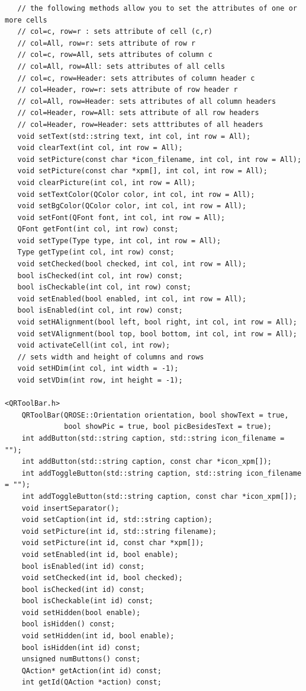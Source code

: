 \begin{enumerate}
\begin{lstlisting}
   // the following methods allow you to set the attributes of one or more cells
   // col=c, row=r : sets attribute of cell (c,r)
   // col=All, row=r: sets attribute of row r
   // col=c, row=All, sets attributes of column c
   // col=All, row=All: sets attributes of all cells
   // col=c, row=Header: sets attributes of column header c
   // col=Header, row=r: sets attribute of row header r
   // col=All, row=Header: sets attributes of all column headers
   // col=Header, row=All: sets attribute of all row headers
   // col=Header, row=Header: sets atttributes of all headers
   void setText(std::string text, int col, int row = All);
   void clearText(int col, int row = All);
   void setPicture(const char *icon_filename, int col, int row = All);
   void setPicture(const char *xpm[], int col, int row = All);
   void clearPicture(int col, int row = All);
   void setTextColor(QColor color, int col, int row = All);
   void setBgColor(QColor color, int col, int row = All);
   void setFont(QFont font, int col, int row = All);
   QFont getFont(int col, int row) const;
   void setType(Type type, int col, int row = All);
   Type getType(int col, int row) const;
   void setChecked(bool checked, int col, int row = All);
   bool isChecked(int col, int row) const;
   bool isCheckable(int col, int row) const;
   void setEnabled(bool enabled, int col, int row = All);
   bool isEnabled(int col, int row) const;
   void setHAlignment(bool left, bool right, int col, int row = All);
   void setVAlignment(bool top, bool bottom, int col, int row = All);
   void activateCell(int col, int row);
   // sets width and height of columns and rows
   void setHDim(int col, int width = -1);
   void setVDim(int row, int height = -1);

<QRToolBar.h>
    QRToolBar(QROSE::Orientation orientation, bool showText = true,
              bool showPic = true, bool picBesidesText = true);
    int addButton(std::string caption, std::string icon_filename = "");
    int addButton(std::string caption, const char *icon_xpm[]);
    int addToggleButton(std::string caption, std::string icon_filename = "");
    int addToggleButton(std::string caption, const char *icon_xpm[]);
    void insertSeparator();
    void setCaption(int id, std::string caption);
    void setPicture(int id, std::string filename);
    void setPicture(int id, const char *xpm[]);
    void setEnabled(int id, bool enable);
    bool isEnabled(int id) const;
    void setChecked(int id, bool checked);
    bool isChecked(int id) const;
    bool isCheckable(int id) const;
    void setHidden(bool enable);
    bool isHidden() const;
    void setHidden(int id, bool enable);
    bool isHidden(int id) const;
    unsigned numButtons() const;
    QAction* getAction(int id) const;
    int getId(QAction *action) const;


\end{lstlisting}
\end{enumerate}
